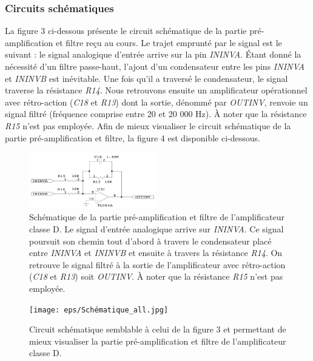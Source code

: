 \documentclass[10pt, oneside, a4paper]{article}
\begin{document}
\subsubsection{Circuits schématiques}
La figure 3 ci-dessous présente le circuit schématique de la partie pré-amplification et filtre reçu au cours. Le trajet emprunté par le signal est le suivant : le signal analogique d'entrée arrive sur la pin \textit{ININVA}. Étant donné la nécessité d'un filtre passe-haut, l'ajout d'un condensateur entre les pins \textit{ININVA} et \textit{ININVB} est inévitable. Une fois qu'il a traversé le condensateur, le signal traverse la résistance \textit{R14}. Nous retrouvons ensuite un amplificateur opérationnel avec rétro-action (\textit{C18} et \textit{R13}) dont la sortie, dénommé par \textit{OUTINV}, renvoie un signal filtré (fréquence comprise entre 20 et 20 000 Hz). À noter que la résistance \textit{R15} n'est pas employée.
Afin de mieux visualiser le circuit schématique de la partie pré-amplification et filtre, la figure 4 est disponible ci-dessous.

\begin{figure}
    \centering
    \includegraphics[width=0.5\textwidth]{eps/Schematique_All.jpg}
    \caption{Schématique de la partie pré-amplification et filtre de l'amplificateur classe D. 
    		 Le signal d'entrée analogique arrive sur \textit{ININVA}. Ce signal poursuit son chemin tout d'abord à travers le condensateur placé entre \textit{ININVA} et \textit{ININVB} et ensuite à travers la résistance \textit{R14}. On retrouve le signal filtré à la sortie de l'amplificateur avec rétro-action (\textit{C18} et \textit{R13}) soit \textit{OUTINV}. À noter que la résistance \textit{R15} n'est pas employée.}
    \label{fig:classeD}
\end{figure}

\begin{figure}
    \centering
    \texttt{[image: eps/Schématique\_all.jpg]}
    \caption{Circuit schématique semblable à celui de la figure 3 et permettant de mieux visualiser la partie pré-amplification et filtre de l'amplificateur classe D.}
    \label{fig:classeD}
\end{figure}
\end{document}
